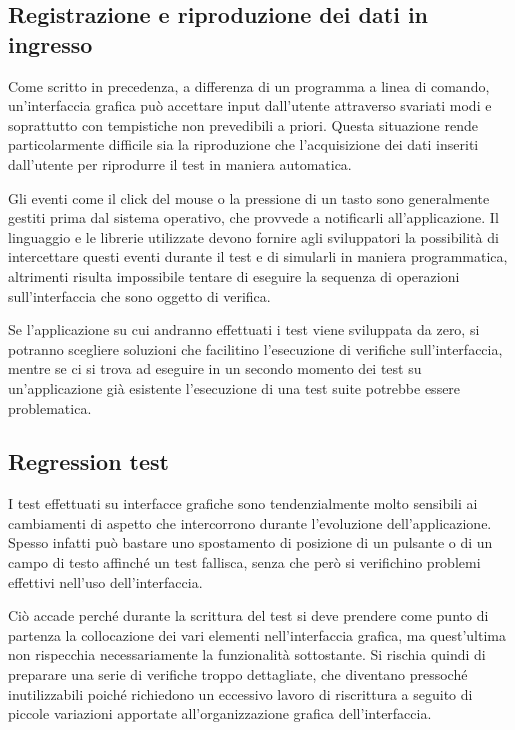 \documentclass[12pt]{toptesi}
\begin{document}
\subsection{Registrazione e riproduzione dei dati in ingresso}

Come scritto in precedenza, a differenza di un programma a linea di comando, un'interfaccia grafica può accettare input dall'utente attraverso svariati modi e soprattutto con tempistiche non prevedibili a priori. Questa situazione rende particolarmente difficile sia la riproduzione che l'acquisizione dei dati inseriti dall'utente per riprodurre il test in maniera automatica. 

Gli eventi come il click del mouse o la pressione di un tasto sono generalmente gestiti prima dal sistema operativo, che provvede a notificarli all'applicazione. Il linguaggio e le librerie utilizzate devono fornire agli sviluppatori la possibilità di intercettare questi eventi durante il test e di simularli in maniera programmatica, altrimenti risulta impossibile tentare di eseguire la sequenza di operazioni sull'interfaccia che sono oggetto di verifica.

Se l'applicazione su cui andranno effettuati i test viene sviluppata da zero, si potranno scegliere soluzioni che facilitino l'esecuzione di verifiche sull'interfaccia, mentre se ci si trova ad eseguire in un secondo momento dei test su un'applicazione già esistente l'esecuzione di una test suite potrebbe essere problematica.

\subsection{Regression test}

I test effettuati su interfacce grafiche sono tendenzialmente molto sensibili ai cambiamenti di aspetto che intercorrono durante l'evoluzione dell'applicazione. Spesso infatti può bastare uno spostamento di posizione di un pulsante o di un campo di testo affinché un test fallisca, senza che però si verifichino problemi effettivi nell'uso dell'interfaccia. 

Ciò accade perché durante la scrittura del test si deve prendere come punto di partenza la collocazione dei vari elementi nell'interfaccia grafica, ma quest'ultima non rispecchia necessariamente la funzionalità sottostante. Si rischia quindi di preparare una serie di verifiche troppo dettagliate, che diventano pressoché inutilizzabili poiché richiedono un eccessivo lavoro di riscrittura a seguito di piccole variazioni apportate all'organizzazione grafica dell'interfaccia.
\end{document}
